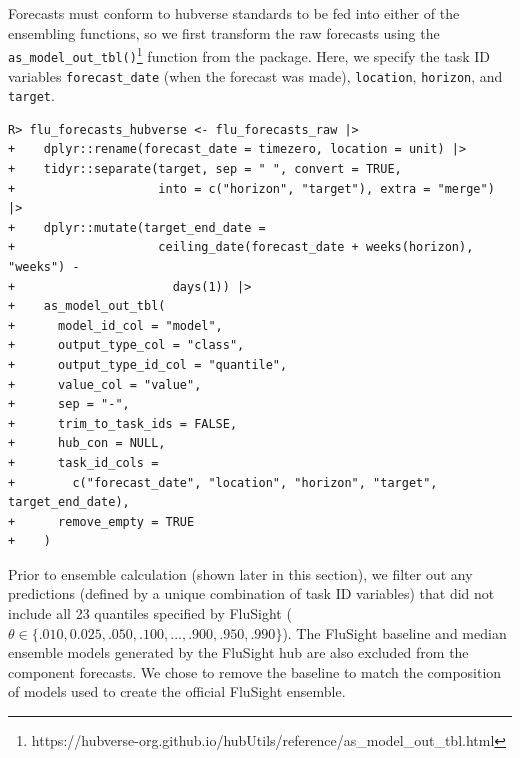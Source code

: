 \documentclass[
  article,
  shortnames,
  notitle]{jss}
\begin{document}
\begin{longtable}[]
\caption{\label{tbl-raw-flu-forecasts}An example prediction of weekly
incident influenza hospitalizations pulled directly from Zoltar. The
example forecasts were made on May 15, 2023 for California at the 1 week
ahead horizon. The forecasts were generated during the FluSight
forecasting challenge, then formatted according to Zoltar standards for
storage. The \texttt{timezero}, \texttt{season}, \texttt{unit},
\texttt{param1}, \texttt{param2}, and \texttt{param3} columns have been
omitted for brevity. (The \texttt{season} column has a value of
`2021-2022' or `2022-2023' while the last three `param' columns always
have a value of NA.)}

\tabularnewline
\end{longtable}

Forecasts must conform to hubverse standards to be fed into either of
the ensembling functions, so we first transform the raw forecasts using
the \texttt{as\_model\_out\_tbl()}\footnote{https://hubverse-org.github.io/hubUtils/reference/as\_model\_out\_tbl.html}
function from the  package. Here, we specify the task ID
variables \texttt{forecast\_date} (when the forecast was made),
\texttt{location}, \texttt{horizon}, and \texttt{target}.

\begin{verbatim}
R> flu_forecasts_hubverse <- flu_forecasts_raw |>
+    dplyr::rename(forecast_date = timezero, location = unit) |>
+    tidyr::separate(target, sep = " ", convert = TRUE,
+                    into = c("horizon", "target"), extra = "merge") |>
+    dplyr::mutate(target_end_date = 
+                    ceiling_date(forecast_date + weeks(horizon), "weeks") -
+                      days(1)) |>
+    as_model_out_tbl(
+      model_id_col = "model",
+      output_type_col = "class",
+      output_type_id_col = "quantile",
+      value_col = "value",
+      sep = "-",
+      trim_to_task_ids = FALSE,
+      hub_con = NULL,
+      task_id_cols = 
+        c("forecast_date", "location", "horizon", "target", target_end_date),
+      remove_empty = TRUE
+    )
\end{verbatim}

Prior to ensemble calculation (shown later in this section), we filter
out any predictions (defined by a unique combination of task ID
variables) that did not include all 23 quantiles specified by FluSight
(\(\theta \in \{.010, 0.025, .050, .100, ..., .900, .950, .990\}\)). The
FluSight baseline and median ensemble models generated by the FluSight
hub are also excluded from the component forecasts. We chose to remove
the baseline to match the composition of models used to create the
official FluSight ensemble.
\end{document}
